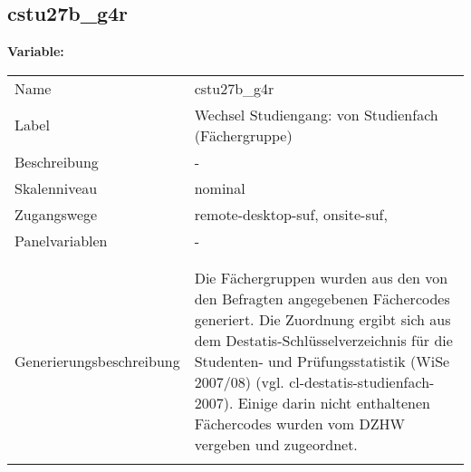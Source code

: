 	
	
	\subsection{cstu27b\_g4r}
	\label{subSection:cstu27b_g4r}

	\noindent\textbf{Variable:}\\
		\begin{tabular}{lL{11.3cm}}
			\label{tableVariable:cstu27b_g4r}
			Name & cstu27b\_g4r \\
			Label & Wechsel Studiengang: von Studienfach (Fächergruppe) \\
			Beschreibung & - \\
			Skalenniveau & nominal \\
			Zugangswege &
				remote-desktop-suf,
				onsite-suf,
 \\
			Panelvariablen & -
			 \\
			 \\
 \\
					Generierungsbeschreibung & Die Fächergruppen wurden aus den von den Befragten angegebenen Fächercodes generiert. Die Zuordnung ergibt sich aus dem Destatis-Schlüsselverzeichnis für die Studenten- und Prüfungsstatistik (WiSe 2007/08) (vgl. cl-destatis-studienfach-2007).  Einige darin nicht enthaltenen Fächercodes wurden vom DZHW vergeben und zugeordnet. 
				 \\	
			 \\
		\end{tabular}






